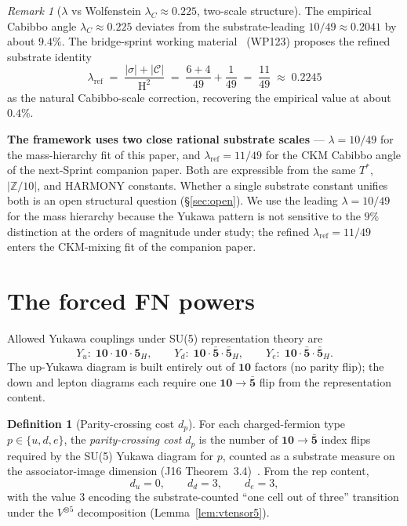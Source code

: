 \documentclass[11pt,reqno]{amsart}
\theoremstyle{plain}
\theoremstyle{definition}
\newtheorem{definition}[theorem]{Definition}
\theoremstyle{remark}
\newtheorem*{remark}{Remark}
\newcommand{\Z}{\mathbb{Z}}
\DeclareMathOperator{\HARM}{H}    %
\newcommand{\Cfour}{\mathcal{C}}  %
\newcommand{\rep}[1]{\mathbf{#1}}
\newcommand{\barrep}[1]{\bar{\mathbf{#1}}}
\begin{document}
\begin{remark}[$\lambda$ vs Wolfenstein $\lambda_{C} \approx 0.225$, two-scale structure]\label{rem:lambda}
The empirical Cabibbo angle $\lambda_{C} \approx 0.225$
deviates from the substrate-leading $10/49 \approx 0.2041$ by
about $9.4\%$. The bridge-sprint working
material~\cite{SandersBridgeSprint2026} (WP123) proposes the
refined substrate identity
\[
  \lambda_{\mathrm{ref}} \;=\;
  \frac{|\sigma| + |\Cfour|}{\HARM^{2}}
  \;=\; \frac{6 + 4}{49} + \frac{1}{49}
  \;=\; \frac{11}{49}
  \;\approx\; 0.2245
\]
as the natural Cabibbo-scale correction, recovering the
empirical value at about $0.4\%$.

\textbf{The framework uses two close rational substrate
scales} --- $\lambda = 10/49$ for the mass-hierarchy fit of
this paper, and $\lambda_{\mathrm{ref}} = 11/49$ for the CKM
Cabibbo angle of the next-Sprint companion paper. Both are
expressible from the same $T^{*}$, $|\Z/10|$, and HARMONY
constants. Whether a single substrate constant unifies both
is an open structural question (\S\ref{sec:open}). We use the
leading $\lambda = 10/49$ for the mass hierarchy because the
Yukawa pattern is not sensitive to the $9\%$ distinction at
the orders of magnitude under study; the refined
$\lambda_{\mathrm{ref}} = 11/49$ enters the CKM-mixing fit
of the companion paper.
\end{remark}

\section{The forced FN powers}\label{sec:powers}

Allowed Yukawa couplings under SU(5) representation theory are
\[
  Y_{u}\colon\; \rep{10} \cdot \rep{10} \cdot \rep{5}_{H},\qquad
  Y_{d}\colon\; \rep{10} \cdot \barrep{5} \cdot \barrep{5}_{H},\qquad
  Y_{e}\colon\; \rep{10} \cdot \barrep{5} \cdot \barrep{5}_{H}.
\]
The up-Yukawa diagram is built entirely out of $\rep{10}$
factors (no parity flip); the down and lepton diagrams each
require one $\rep{10} \to \barrep{5}$ flip from the
representation content.

\begin{definition}[Parity-crossing cost $d_{p}$]\label{def:dp}
For each charged-fermion type $p \in \{u, d, e\}$, the
\emph{parity-crossing cost} $d_{p}$ is the number of
$\rep{10} \to \barrep{5}$ index flips required by the SU(5)
Yukawa diagram for $p$, counted as a substrate measure on
the associator-image dimension (J16
Theorem~3.4)~\cite{SandersGish2026DiscreteDirac}. From the
rep content,
\[
  d_{u} = 0,\qquad d_{d} = 3,\qquad d_{e} = 3,
\]
with the value $3$ encoding the substrate-counted
``one cell out of three'' transition under the $V^{\otimes 5}$
decomposition (Lemma~\ref{lem:vtensor5}).
\end{definition}
\end{document}
